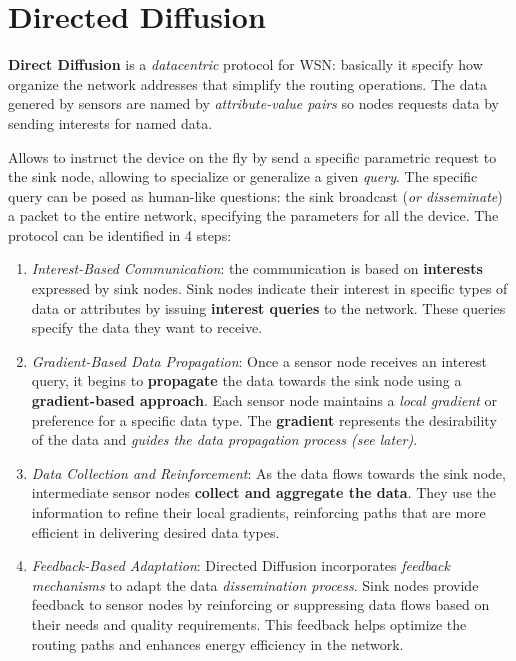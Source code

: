 \documentclass[10pt,a4paper]{report}
\theoremstyle{definition}
\begin{document}
\section{Directed Diffusion}\label{sec:directed-diffusion}
\textbf{Direct Diffusion} is a \textit{datacentric} protocol for WSN: basically it specify how organize the network addresses that simplify the routing operations. The data genered by sensors are named by \textit{attribute-value pairs} so nodes requests data by sending interests for named data.

Allows to instruct the device on the fly by send a specific parametric request to the sink node, allowing to specialize or generalize a given \textit{query}.
The specific query can be posed as human-like questions: the sink broadcast (\textit{or disseminate}) a packet to the entire network, specifying the parameters for all the device.
The protocol can be identified in 4 steps:
\begin{enumerate}
	\item 
	\textit{Interest-Based Communication}: the communication is based on \textbf{interests} expressed by sink nodes. Sink nodes indicate their interest in specific types of data or attributes by issuing \textbf{interest queries} to the network. These queries specify the data they want to receive.
	\item 
	\textit{Gradient-Based Data Propagation}: Once a sensor node receives an interest query, it begins to \textbf{propagate} the data towards the sink node using a \textbf{gradient-based approach}. Each sensor node maintains a \textit{local gradient} or preference for a specific data type. The \textbf{gradient} represents the desirability of the data and \textit{guides the data propagation process (see later)}.
	\item 
	\textit{Data Collection and Reinforcement}: As the data flows towards the sink node, intermediate sensor nodes \textbf{collect and aggregate the data}. They use the information to refine their local gradients, reinforcing paths that are more efficient in delivering desired data types.
	\item 
	\textit{Feedback-Based Adaptation}: Directed Diffusion incorporates \textit{feedback mechanisms} to adapt the data \textit{dissemination process}. Sink nodes provide feedback to sensor nodes by reinforcing or suppressing data flows based on their needs and quality requirements. This feedback helps optimize the routing paths and enhances energy efficiency in the network.
\end{enumerate}
\end{document}
